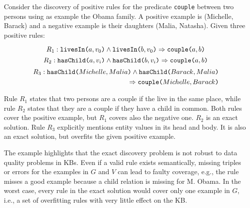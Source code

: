 \begin{example}
	Consider the discovery of positive rules for the predicate {\tt couple} between two persons using as example the Obama family. A positive example is (Michelle, Barack) and a negative example is their daughters (Malia, Natasha). 
	Given three positive rules:
	
	\vspace{-2ex}	
	{\small	
		\begin{equation*}
		R_{1}:	\texttt{livesIn(}a,v_0\texttt{)} \wedge \texttt{livesIn(}b,v_0\texttt{)} \Rightarrow  \texttt{couple(}a,b\texttt{)}  
		\end{equation*}
			\vspace{-2ex}	
		\begin{equation*}
		R_{2}:	\texttt{hasChild(}a,v_i\texttt{)} \wedge \texttt{hasChild(}b,v_i\texttt{)} \Rightarrow  \texttt{couple(}a,b\texttt{)}  
		\end{equation*}
		\vspace{-2ex}	
		\begin{equation*}
			\begin{split}
			R_{3}:	\texttt{hasChild(}Michelle,Malia\texttt{)} \wedge  \texttt{hasChild(}Barack,Malia\texttt{)} \\ \Rightarrow \texttt{couple(}Michelle,Barack\texttt{)}
			\end{split}
		\end{equation*}
	}
	\vspace{-2ex}	
	
	\noindent
	Rule $R_{1}$ states that two persons are a couple if the live in the same place, while rule $R_{2}$ states that they are a couple if they have a child in common. Both rules cover the positive example, but $R_{1}$ covers also the negative one.
	$R_{2}$ is an exact solution. Rule $R_{3}$ explicitly mentions entity values in its head and body. It is also an exact solution, but overfits the given positive example. %
\end{example} 

The example highlights that the exact discovery problem is not robust to %
data quality problems in KBs. Even if a valid rule exists semantically, missing triples or errors for the examples in $G$ and $V$ can lead to faulty coverage, e.g., the rule misses a good example because a child relation is missing for M. Obama. %
In the worst case, %
every rule in the exact solution would cover only one example in $G$, %
i.e., a set of overfitting rules with very little effect on the KB.

